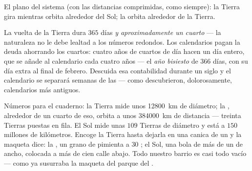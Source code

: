 \begin{omfigure}

{\small El plano del sistema (con las distancias comprimidas, como
siempre): la Tierra gira mientras orbita alrededor del Sol; la
 orbita alrededor de la Tierra.}
\end{omfigure}

\begin{example}\label{ex:g6:sun-earth-moon:leap}
La vuelta de la Tierra dura $365$ días \emph{y aproximadamente un
cuarto} --- la naturaleza no le debe lealtad a los números redondos.
Los calendarios pagan la deuda ahorrando los cuartos: cuatro años de
cuartos de día hacen un día entero, que se añade al calendario cada
cuatro años --- el \emph{año bisiesto} de $366$ días, con su día extra
al final de febrero. Descuida esa contabilidad durante un siglo y el
calendario se separará semanas de las  --- como
descubrieron, dolorosamente, calendarios más antiguos.
\end{example}

\begin{example}\label{ex:g6:sun-earth-moon:scale}
Números para el cuaderno: la Tierra mide unos \qty{12800}{km} de
diámetro; la , alrededor de un cuarto de eso, orbita a unos
\qty{384000}{km} de distancia --- treinta Tierras puestas en fila. El
Sol mide unas $109$ Tierras de diámetro y está a $150$ millones de
kilómetros. Encoge la Tierra hasta dejarla en una canica de un
 y la maqueta dice: la , un grano de pimienta a $30$
; el Sol, una bola de más de un  de ancho,
colocada a más de cien  calle abajo. Todo nuestro barrio es
casi todo vacío --- como ya susurraba la maqueta del parque del
.
\end{example}

